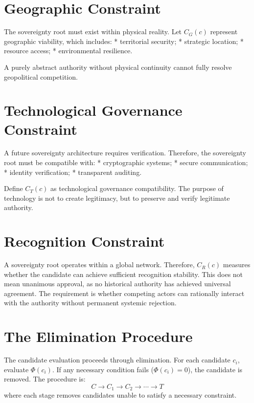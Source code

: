 \documentclass[11pt,openany]{book}
\theoremstyle{plain}
\theoremstyle{definition}
\begin{document}
\section*{Geographic Constraint}

The sovereignty root must exist within physical reality. Let \(C_G(c)\) represent geographic viability, which includes:
* territorial security;
* strategic location;
* resource access;
* environmental resilience.

A purely abstract authority without physical continuity cannot fully resolve geopolitical competition.

\section*{Technological Governance Constraint}

A future sovereignty architecture requires verification. Therefore, the sovereignty root must be compatible with:
* cryptographic systems;
* secure communication;
* identity verification;
* transparent auditing.

Define \(C_T(c)\) as technological governance compatibility. The purpose of technology is not to create legitimacy, but to preserve and verify legitimate authority.

\section*{Recognition Constraint}

A sovereignty root operates within a global network. Therefore, \(C_R(c)\) measures whether the candidate can achieve sufficient recognition stability. This does not mean unanimous approval, as no historical authority has achieved universal agreement. The requirement is whether competing actors can rationally interact with the authority without permanent systemic rejection.

\section*{The Elimination Procedure}

The candidate evaluation proceeds through elimination. For each candidate \(c_i\), evaluate \(\Phi(c_i)\). If any necessary condition fails (\(\Phi(c_i) = 0\)), the candidate is removed. The procedure is:
\[
C \longrightarrow C_1 \longrightarrow C_2 \longrightarrow \cdots \longrightarrow T
\]
where each stage removes candidates unable to satisfy a necessary constraint.
\end{document}
